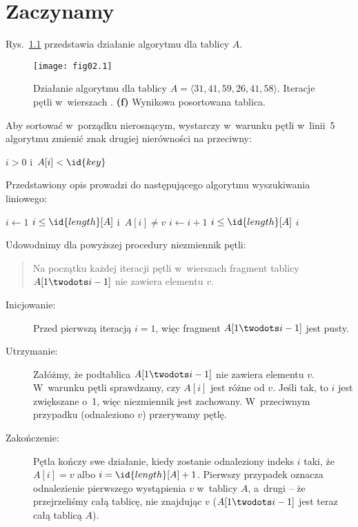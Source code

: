 \chapter{Zaczynamy}


\exercise %
Rys.~\ref{fig:2.1-1} przedstawia działanie algorytmu  dla tablicy $A$.
\begin{figure}[ht]
	\begin{center}
		\texttt{[image: fig02.1]}
	\end{center}
	\caption{Działanie algorytmu  dla tablicy $A=\langle31,41,59,26,41,58\rangle$. {\sffamily\bfseries{}} Iteracje pętli  w~wierszach . {\sffamily\bfseries(f)} Wynikowa posortowana tablica.} \label{fig:2.1-1}
\end{figure}

\exercise %
Aby sortować w~porządku nierosnącym, wystarczy w~warunku pętli  w~linii~5 algorytmu  zmienić znak drugiej nierówności na przeciwny:
\begin{codebox}
\setcounter{codelinenumber}{4}
\li	\While $i>0$ i~$A[i]<\id{key}$
\end{codebox}

\exercise %
Przedstawiony opis prowadzi do następującego algorytmu wyszukiwania liniowego:
\begin{codebox}
\li	$i\gets1$
\li	\While $i\le\id{length}[A]$ i~$A[i]\ne v$ \label{li:linear-search-while-begin}
\li		\Do $i\gets i+1$
		\End \label{li:linear-search-while-end}
\li	\If $i\le\id{length}[A]$
\li		\Then \Return $i$
		\End
\li	\Return {}
\end{codebox}

Udowodnimy dla powyższej procedury niezmiennik pętli:
\begin{quote}
Na początku każdej iteracji pętli  w~wierszach \twodashes{\ref{li:linear-search-while-begin}}{\ref{li:linear-search-while-end}} fragment tablicy $A[1\twodots i-1]$ nie zawiera elementu $v$.
\end{quote}
\begin{description}
	\item[Inicjowanie:] Przed pierwszą iteracją $i=1$, więc fragment $A[1\twodots i-1]$ jest pusty.
	\item[Utrzymanie:] Załóżmy, że podtablica $A[1\twodots i-1]$ nie zawiera elementu $v$. W~warunku pętli  sprawdzamy, czy $A[i]$ jest różne od $v$. Jeśli tak, to $i$ jest zwiększane o~1, więc niezmiennik jest zachowany. W~przeciwnym przypadku (odnaleziono $v$) przerywamy pętlę.
	\item[Zakończenie:] Pętla kończy swe działanie, kiedy zostanie odnaleziony indeks $i$ taki, że $A[i]=v$ albo $i=\id{length}[A]+1$. Pierwszy przypadek oznacza odnalezienie pierwszego wystąpienia $v$ w~tablicy $A$, a~drugi -- że przejrzeliśmy całą tablicę, nie znajdując $v$ ($A[1\twodots i-1]$ jest teraz całą tablicą $A$).
\end{description}

